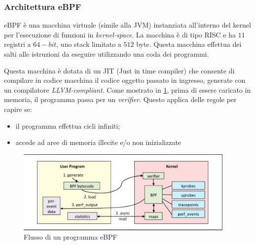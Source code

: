 \documentclass{article}
\begin{document}
\subsubsection{Architettura eBPF}
eBPF è una macchina virtuale (simile alla JVM) instanziata all'interno del kernel per l'esecuzione di funzioni in \textit{kernel-space}. La macchina è di tipo RISC e ha $11$ registri a $64-bit$, uno stack limitato a $512$ byte. Questa macchina effettua dei salti alle istruzioni da eseguire utilizzando una coda dei programmi.

Questa macchina è dotata di un JIT (Just in time compiler) che consente di compilare in codice macchina il codice oggetto passato in ingresso, generate con un compilatore \textit{LLVM-compliant}. Come mostrato in \cref{fig:ebpf_arch}, prima di essere caricato in memoria, il programma passa per un \textit{verifier}. Questo applica delle regole per capire se:
\begin{itemize}
  \item il programma effettua cicli infiniti;
  \item accede ad aree di memoria illecite e/o non inizializzate
\end{itemize}

\begin{figure}
  \begin{center}
    \includegraphics[width=0.95\textwidth]{./figures/ch2/ebpf_arch.png}
  \end{center}
  \caption{Flusso di un programma eBPF}\label{fig:ebpf_arch}
\end{figure}
\end{document}
